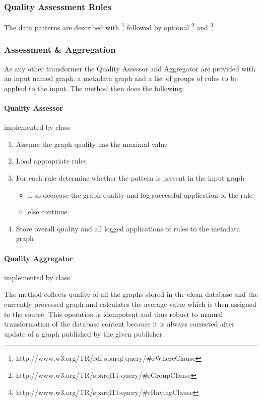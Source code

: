 \subsubsection*{Quality Assessment Rules}

The data patterns are described with \footnote{http://www.w3.org/TR/rdf-sparql-query/\#rWhereClause} followed by optional \footnote{http://www.w3.org/TR/sparql11-query/\#rGroupClause} and \footnote{http://www.w3.org/TR/sparql11-query/\#rHavingClause}

\subsubsection*{Assessment \& Aggregation}

As any other transformer the Quality Assessor and Aggregator are provided with an input named graph, a metadata graph and a list of groups of rules to be applied to the input. The  method then does the following:

\paragraph{Quality Assessor} implemented by class 

\begin{enumerate}
	\item Assume the graph quality has the maximal value
	\item Load appropriate rules
	\item For each rule determine whether the pattern is present in the input graph
	\begin{itemize}
		\item if so decrease the graph quality and log successful application of the rule
		\item else continue
	\end{itemize}
	\item Store overall quality and all logged applications of rules to the metadata graph
\end{enumerate}

\paragraph{Quality Aggregator} implemented by class 

The  method collects quality of all the graphs stored in the clean database and the currently processed graph and calculates the average value which is then assigned to the source. This operation is idempotent and thus robust to manual transformation of the database content because it is always corrected after update of a graph published by the given publisher.

